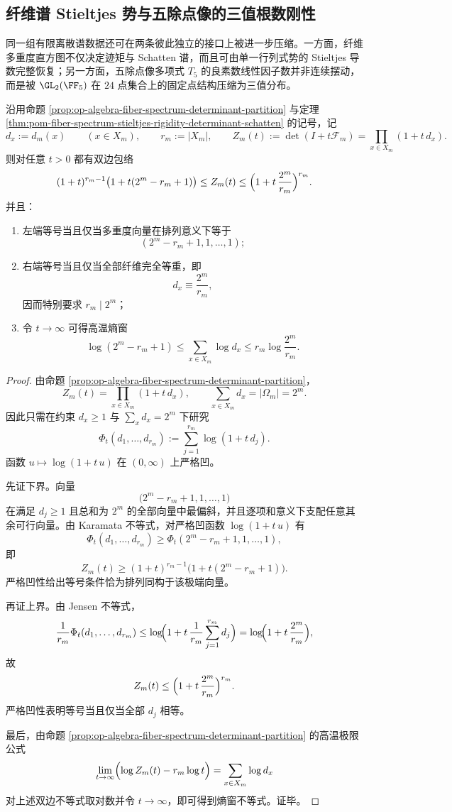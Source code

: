 \subsection{纤维谱 Stieltjes 势与五除点像的三值根数刚性}

同一组有限离散谱数据还可在两条彼此独立的接口上被进一步压缩。一方面，纤维多重度直方图不仅决定迹矩与 Schatten 谱，而且可由单一行列式势的 Stieltjes 导数完整恢复；另一方面，五除点像多项式 \(T_5\) 的良素数线性因子数并非连续摆动，而是被 \(\GL_2(\FF_5)\) 在 \(24\) 点集合上的固定点结构压缩为三值分布。

\begin{theorem}[纤维谱行列式势的极值包络与高温熵窗]\label{thm:derived-fiber-determinant-extremal-envelope}
沿用命题 \ref{prop:op-algebra-fiber-spectrum-determinant-partition} 与定理 \ref{thm:pom-fiber-spectrum-stieltjes-rigidity-determinant-schatten} 的记号，记
\[
d_x:=d_m(x)\qquad(x\in X_m),
\qquad
r_m:=|X_m|,
\qquad
Z_m(t):=\det(I+t\mathcal F_m)=\prod_{x\in X_m}(1+t\,d_x).
\]
则对任意 \(t>0\) 都有双边包络
\[
(1+t)^{r_m-1}\bigl(1+t(2^m-r_m+1)\bigr)
\le
Z_m(t)
\le
\Bigl(1+t\,\frac{2^m}{r_m}\Bigr)^{r_m}.
\]
并且：
\begin{enumerate}
  \item 左端等号当且仅当多重度向量在排列意义下等于
  \[
  (2^m-r_m+1,1,\dots,1);
  \]
  \item 右端等号当且仅当全部纤维完全等重，即
  \[
  d_x\equiv \frac{2^m}{r_m},
  \]
  因而特别要求 \(r_m\mid 2^m\)；
  \item 令 \(t\to\infty\) 可得高温熵窗
  \[
  \log(2^m-r_m+1)
  \le
  \sum_{x\in X_m}\log d_x
  \le
  r_m\log\frac{2^m}{r_m}.
  \]
\end{enumerate}
\end{theorem}

\begin{proof}
由命题 \ref{prop:op-algebra-fiber-spectrum-determinant-partition}，
\[
Z_m(t)=\prod_{x\in X_m}(1+t\,d_x),
\qquad
\sum_{x\in X_m}d_x=|\Omega_m|=2^m.
\]
因此只需在约束
\(
d_x\ge 1
\)
与
\(
\sum_x d_x=2^m
\)
下研究
\[
\Phi_t(d_1,\dots,d_{r_m})
:=
\sum_{j=1}^{r_m}\log(1+t\,d_j).
\]
函数
\(
u\mapsto \log(1+t\,u)
\)
在 \((0,\infty)\) 上严格凹。

先证下界。向量
\[
\bigl(2^m-r_m+1,1,\dots,1\bigr)
\]
在满足 \(d_j\ge 1\) 且总和为 \(2^m\) 的全部向量中最偏斜，并且逐项和意义下支配任意其余可行向量。由 Karamata 不等式，对严格凹函数 \(\log(1+t\,u)\) 有
\[
\Phi_t(d_1,\dots,d_{r_m})
\ge
\Phi_t(2^m-r_m+1,1,\dots,1),
\]
即
\[
Z_m(t)\ge (1+t)^{r_m-1}\bigl(1+t(2^m-r_m+1)\bigr).
\]
严格凹性给出等号条件恰为排列同构于该极端向量。

再证上界。由 Jensen 不等式，
\[
\frac{1}{r_m}\Phi_t(d_1,\dots,d_{r_m})
\le
\log\!\Bigl(1+t\,\frac{1}{r_m}\sum_{j=1}^{r_m}d_j\Bigr)
=
\log\!\Bigl(1+t\,\frac{2^m}{r_m}\Bigr),
\]
故
\[
Z_m(t)\le \Bigl(1+t\,\frac{2^m}{r_m}\Bigr)^{r_m}.
\]
严格凹性表明等号当且仅当全部 \(d_j\) 相等。

最后，由命题 \ref{prop:op-algebra-fiber-spectrum-determinant-partition} 的高温极限公式
\[
\lim_{t\to\infty}\Bigl(\log Z_m(t)-r_m\log t\Bigr)
=
\sum_{x\in X_m}\log d_x
\]
对上述双边不等式取对数并令 \(t\to\infty\)，即可得到熵窗不等式。证毕。
\end{proof}


